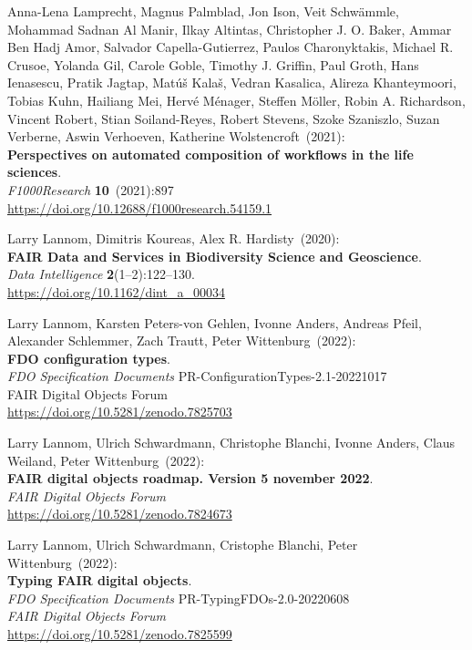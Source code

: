 \begin{thebibliography}{9}
Anna-Lena Lamprecht, Magnus Palmblad, Jon Ison, Veit Schwämmle, Mohammad Sadnan Al Manir, Ilkay Altintas, Christopher J. O. Baker, Ammar Ben Hadj Amor, Salvador Capella-Gutierrez, Paulos Charonyktakis, Michael R. Crusoe, Yolanda Gil, Carole Goble, Timothy J. Griffin, Paul Groth, Hans Ienasescu, Pratik Jagtap, Matúš Kalaš, Vedran Kasalica, Alireza Khanteymoori, Tobias Kuhn, Hailiang Mei, Hervé Ménager, Steffen Möller, Robin A. Richardson, Vincent Robert, Stian Soiland-Reyes, Robert Stevens, Szoke Szaniszlo, Suzan Verberne, Aswin Verhoeven, Katherine Wolstencroft~(2021): \\
\textbf{Perspectives on automated composition of workflows in the life sciences}. \\
\emph{F1000Research} \textbf{10}~(2021):897 \\
\url{https://doi.org/10.12688/f1000research.54159.1}

Larry Lannom, Dimitris Koureas, Alex R. Hardisty~(2020): \\
\textbf{FAIR Data and Services in Biodiversity Science and Geoscience}.\\
\emph{Data Intelligence} \textbf{2}(1--2):122--130.\\
\url{https://doi.org/10.1162/dint_a_00034}

Larry Lannom, Karsten Peters-von Gehlen, Ivonne Anders, Andreas Pfeil, Alexander Schlemmer, Zach Trautt, Peter Wittenburg~(2022): \\
\textbf{{FDO} configuration types}. \\
\emph{FDO Specification Documents} PR-ConfigurationTypes-2.1-20221017 \\
FAIR Digital Objects Forum \\
\url{https://doi.org/10.5281/zenodo.7825703}

Larry Lannom, Ulrich Schwardmann, Christophe Blanchi, Ivonne Anders, Claus Weiland, Peter Wittenburg~(2022): \\
\textbf{FAIR digital objects roadmap. Version 5 november 2022}.\\
\emph{FAIR Digital Objects Forum}\\
\url{https://doi.org/10.5281/zenodo.7824673}

Larry Lannom, Ulrich Schwardmann, Cristophe Blanchi, Peter Wittenburg~(2022): \\
\textbf{Typing {FAIR} digital objects}. \\
\emph{FDO Specification Documents} PR-TypingFDOs-2.0-20220608 \\
\emph{FAIR Digital Objects Forum}\\
\url{https://doi.org/10.5281/zenodo.7825599}


\end{thebibliography}
